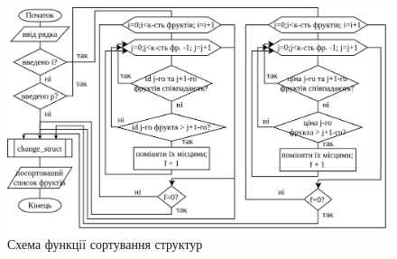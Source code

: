 \documentclass[12pt]{extreport}
\begin{document}
\begin{figure}[h]
	\centering
	\includegraphics[width=.8\textwidth]{fch2/sort.png}
	\caption{Схема функції сортування структур}
	\label{task2}
\end{figure}
\end{document}
